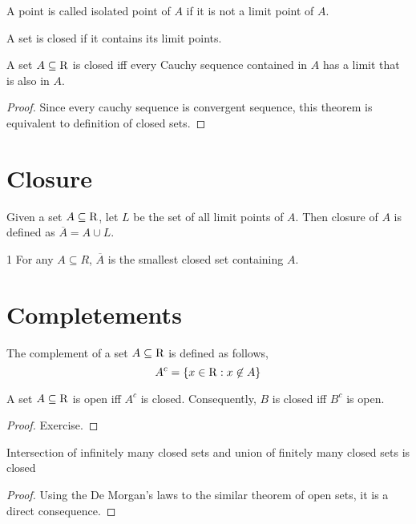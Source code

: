 \begin{definition} A point is called isolated point of $A$ if it is not a limit point of $A$.
\end{definition}
\begin{definition} A set is closed if it contains its limit points.
\end{definition}
\begin{theorem} A set $A \subseteq {\operatorname{R}}$ is closed iff every Cauchy sequence contained in $A$ has a limit that is also in $A$.
    \begin{proof}
        Since every cauchy sequence is convergent sequence, this theorem is equivalent to definition of closed sets.
    \end{proof}
\end{theorem}
\section{Closure}
\begin{definition}
    Given a set $A \subseteq {\operatorname{R}}$, let $L$ be the set of all limit points of $A$. Then closure of $A$ is defined as $\overline{A} = A \cup L$.
\end{definition}

\begin{theorem}1
    For any $A \subseteq R$, $\overline{A}$ is the smallest closed set containing $A$.
\end{theorem}
\section{Completements}
\begin{definition} The complement of  a set $A \subseteq {\operatorname{R}}$ is defined as follows,
    \[ A^c = \{x \in {\operatorname{R}} : x \not\in A\}\]
\end{definition}

\begin{theorem}
    A set $A \subseteq {\operatorname{R}}$ is open iff $A^c$ is closed. Consequently, $B$ is closed iff $B^c$ is open.
    \begin{proof} Exercise.
    \end{proof}
\end{theorem}
\begin{theorem} Intersection of infinitely many closed sets and union of finitely many closed sets is closed
    \begin{proof} Using the De Morgan's laws to the similar theorem of open sets, it is a direct consequence.
    \end{proof}
\end{theorem}
